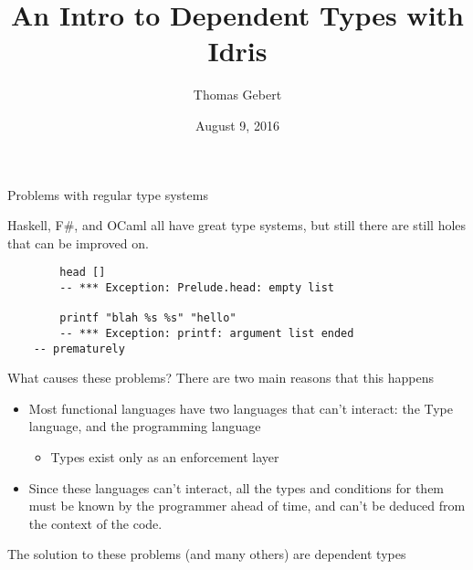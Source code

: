 \documentclass{beamer}
\title{An Intro to Dependent Types with Idris}
\subtitle{}
\author{Thomas Gebert}
\date{August 9, 2016}
\begin{document}
  \frame{\titlepage}
\begin{frame}[fragile]{Problems with regular type systems}
	
 	\transdissolve[duration=0.3]
	Haskell, F\#, and OCaml all have great type systems, but still there are still holes that can be improved on.
	\pause
	\begin{lstlisting}
		head []
		-- *** Exception: Prelude.head: empty list

		printf "blah %s %s" "hello"
		-- *** Exception: printf: argument list ended 
    -- prematurely
	\end{lstlisting}

\end{frame}
\begin{frame}{What causes these problems?}
	\transdissolve[duration=0.3]
	There are two main reasons that this happens
	\begin{itemize}
		\pause
		\item Most functional languages have two languages that can't interact: the Type language, and the programming language \begin{itemize}
			\pause
			\item Types exist only as an enforcement layer\end{itemize}
		\pause
		\item Since these languages can't interact, all the types and conditions for them must be known by the programmer ahead of time, and can't be deduced from the context of the code.
	\end{itemize}
\end{frame}
\begin{frame}
\begin{center}
 	\transdissolve[duration=0.3]
 The solution to these problems (and many others) are dependent types
\end{center}
\end{frame}
\end{document}
